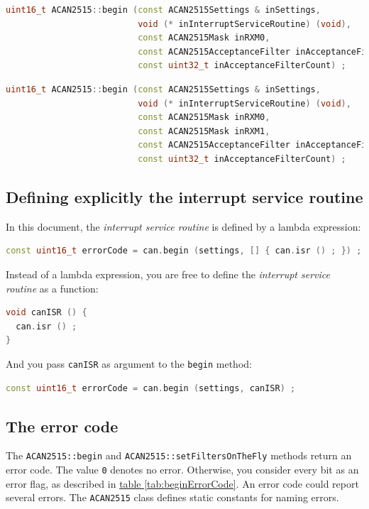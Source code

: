 \documentclass[9pt, a4paper, obeyspaces]{extarticle}
\newcommand \subsectionLabel[2]{\subsection{#1}\label{subsec:#2}}
\newcommand\refTableau[1]{\hyperref[tab:#1]{table \ref*{tab:#1}}}
\begin{document}
{ \small\begin{lstlisting}[language=c++]
uint16_t ACAN2515::begin (const ACAN2515Settings & inSettings,
                          void (* inInterruptServiceRoutine) (void),
                          const ACAN2515Mask inRXM0,
                          const ACAN2515AcceptanceFilter inAcceptanceFilters [],
                          const uint32_t inAcceptanceFilterCount) ;
\end{lstlisting}}

{ \small\begin{lstlisting}[language=c++]
uint16_t ACAN2515::begin (const ACAN2515Settings & inSettings,
                          void (* inInterruptServiceRoutine) (void),
                          const ACAN2515Mask inRXM0,
                          const ACAN2515Mask inRXM1,
                          const ACAN2515AcceptanceFilter inAcceptanceFilters [],
                          const uint32_t inAcceptanceFilterCount) ;
\end{lstlisting}}



\subsectionLabel{Defining explicitly the interrupt service routine}{isrExplicit}

In this document, the \emph{interrupt service routine} is defined by a lambda expression:
{ \small\begin{lstlisting}[language=c++]
  const uint16_t errorCode = can.begin (settings, [] { can.isr () ; }) ;
\end{lstlisting}}

Instead of a lambda expression, you are free to define the \emph{interrupt service routine} as a function:
{ \small\begin{lstlisting}[language=c++]
void canISR () {
  can.isr () ;
}
\end{lstlisting}}

And you pass \texttt{canISR} as argument to the \texttt{begin} method:
{ \small\begin{lstlisting}[language=c++]
  const uint16_t errorCode = can.begin (settings, canISR) ;
\end{lstlisting}}


\subsectionLabel{The error code}{errorCodeMethodBegin}

The \texttt{ACAN2515::begin} and \texttt{ACAN2515::setFiltersOnTheFly} methods return an error code. The value \texttt{0} denotes no error. Otherwise, you consider every bit as an error flag, as described in \refTableau{beginErrorCode}. An error code could report several errors. The \texttt{ACAN2515} class defines static constants for naming errors.
\end{document}
